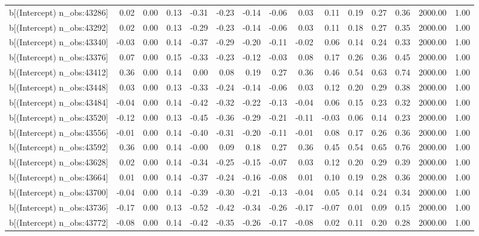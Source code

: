 \begin{table}[ht]
\begin{tabular}{rrrrrrrrrrrrrrr}
  b[(Intercept) n\_obs:43286] & 0.02 & 0.00 & 0.13 & -0.31 & -0.23 & -0.14 & -0.06 & 0.03 & 0.11 & 0.19 & 0.27 & 0.36 & 2000.00 & 1.00 \\ 
  b[(Intercept) n\_obs:43292] & 0.02 & 0.00 & 0.13 & -0.29 & -0.23 & -0.14 & -0.06 & 0.03 & 0.11 & 0.18 & 0.27 & 0.35 & 2000.00 & 1.00 \\ 
  b[(Intercept) n\_obs:43340] & -0.03 & 0.00 & 0.14 & -0.37 & -0.29 & -0.20 & -0.11 & -0.02 & 0.06 & 0.14 & 0.24 & 0.33 & 2000.00 & 1.00 \\ 
  b[(Intercept) n\_obs:43376] & 0.07 & 0.00 & 0.15 & -0.33 & -0.23 & -0.12 & -0.03 & 0.08 & 0.17 & 0.26 & 0.36 & 0.45 & 2000.00 & 1.00 \\ 
  b[(Intercept) n\_obs:43412] & 0.36 & 0.00 & 0.14 & 0.00 & 0.08 & 0.19 & 0.27 & 0.36 & 0.46 & 0.54 & 0.63 & 0.74 & 2000.00 & 1.00 \\ 
  b[(Intercept) n\_obs:43448] & 0.03 & 0.00 & 0.13 & -0.33 & -0.24 & -0.14 & -0.06 & 0.03 & 0.12 & 0.20 & 0.29 & 0.38 & 2000.00 & 1.00 \\ 
  b[(Intercept) n\_obs:43484] & -0.04 & 0.00 & 0.14 & -0.42 & -0.32 & -0.22 & -0.13 & -0.04 & 0.06 & 0.15 & 0.23 & 0.32 & 2000.00 & 1.00 \\ 
  b[(Intercept) n\_obs:43520] & -0.12 & 0.00 & 0.13 & -0.45 & -0.36 & -0.29 & -0.21 & -0.11 & -0.03 & 0.06 & 0.14 & 0.23 & 2000.00 & 1.00 \\ 
  b[(Intercept) n\_obs:43556] & -0.01 & 0.00 & 0.14 & -0.40 & -0.31 & -0.20 & -0.11 & -0.01 & 0.08 & 0.17 & 0.26 & 0.36 & 2000.00 & 1.00 \\ 
  b[(Intercept) n\_obs:43592] & 0.36 & 0.00 & 0.14 & -0.00 & 0.09 & 0.18 & 0.27 & 0.36 & 0.45 & 0.54 & 0.65 & 0.76 & 2000.00 & 1.00 \\ 
  b[(Intercept) n\_obs:43628] & 0.02 & 0.00 & 0.14 & -0.34 & -0.25 & -0.15 & -0.07 & 0.03 & 0.12 & 0.20 & 0.29 & 0.39 & 2000.00 & 1.00 \\ 
  b[(Intercept) n\_obs:43664] & 0.01 & 0.00 & 0.14 & -0.37 & -0.24 & -0.16 & -0.08 & 0.01 & 0.10 & 0.19 & 0.28 & 0.36 & 2000.00 & 1.00 \\ 
  b[(Intercept) n\_obs:43700] & -0.04 & 0.00 & 0.14 & -0.39 & -0.30 & -0.21 & -0.13 & -0.04 & 0.05 & 0.14 & 0.24 & 0.34 & 2000.00 & 1.00 \\ 
  b[(Intercept) n\_obs:43736] & -0.17 & 0.00 & 0.13 & -0.52 & -0.42 & -0.34 & -0.26 & -0.17 & -0.07 & 0.01 & 0.09 & 0.15 & 2000.00 & 1.00 \\ 
  b[(Intercept) n\_obs:43772] & -0.08 & 0.00 & 0.14 & -0.42 & -0.35 & -0.26 & -0.17 & -0.08 & 0.02 & 0.11 & 0.20 & 0.28 & 2000.00 & 1.00 \\ 

\end{tabular}
\end{table}
